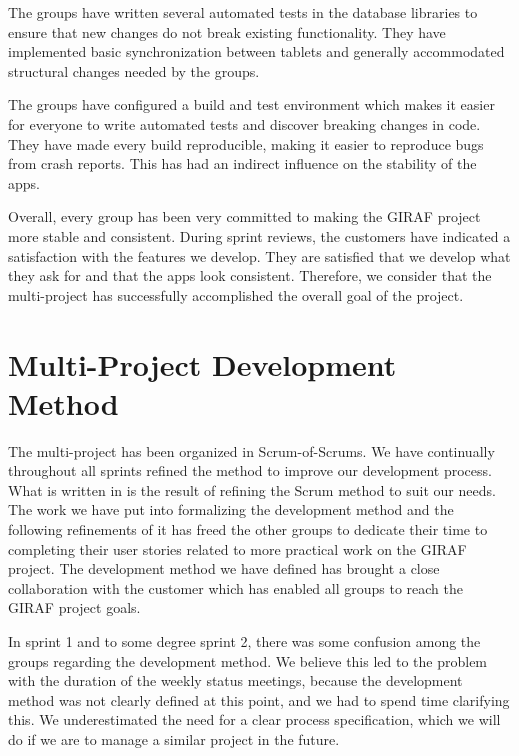 The \db{} groups have written several automated tests in the database libraries to ensure that new changes do not break existing functionality. They have implemented basic synchronization between tablets and generally accommodated structural changes needed by the \gui{} groups.

The \bd{} groups have configured a build and test environment which makes it easier for everyone to write automated tests and discover breaking changes in code. They have made every build reproducible, making it easier to reproduce bugs from crash reports. This has had an indirect influence on the stability of the apps.

Overall, every group has been very committed to making the GIRAF project more stable and consistent. During sprint reviews, the customers have indicated a satisfaction with the features we develop. They are satisfied that we develop what they ask for and that the apps look consistent. Therefore, we consider that the multi-project has successfully accomplished the overall goal of the project.

\section{Multi-Project Development Method}\label{conc:multi_project_process_eval}
The multi-project has been organized in Scrum-of-Scrums. We have continually throughout all sprints refined the method to improve our development process. What is written in  is the result of refining the Scrum method to suit our needs. The work we have put into formalizing the development method and the following refinements of it has freed the other groups to dedicate their time to completing their user stories related to more practical work on the GIRAF project. The development method we have defined has brought a close collaboration with the customer which has enabled all groups to reach the GIRAF project goals.

In sprint 1 and to some degree sprint 2, there was some confusion among the groups regarding the development method. We believe this led to the problem with the duration of the weekly status meetings, because the development method was not clearly defined at this point, and we had to spend time clarifying this. We underestimated the need for a clear process specification, which we will do if we are to manage a similar project in the future. 

